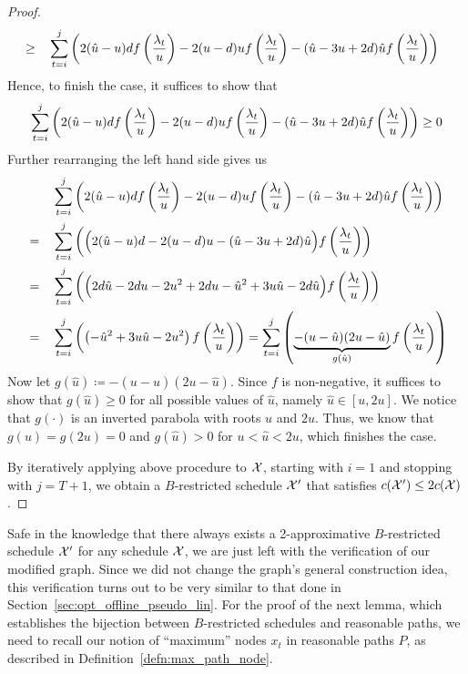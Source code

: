 \begin{proof}
\begin{align*}
	&\ge&&\sum\limits_{t=i}^j\left(2(\hat{u}-u)d\*f\left(\frac{\lambda_t}{u}\right)-2(u-d)uf\left(\frac{\lambda_t}{u}\right)-(\hat{u}-3u+2d)\hat{u}f\left(\frac{\lambda_t}{u}\right)\right)
\end{align*}
Hence, to finish the case, it suffices to show that
\begin{equation*}
	\sum\limits_{t=i}^j\left(2(\hat{u}-u)d\*f\left(\frac{\lambda_t}{u}\right)-2(u-d)uf\left(\frac{\lambda_t}{u}\right)-(\hat{u}-3u+2d)\hat{u}f\left(\frac{\lambda_t}{u}\right)\right)\ge 0
\end{equation*}
Further rearranging the left hand side gives us
\begin{align*}
	&&&\sum\limits_{t=i}^j\left(2(\hat{u}-u)d\*f\left(\frac{\lambda_t}{u}\right)-2(u-d)uf\left(\frac{\lambda_t}{u}\right)-(\hat{u}-3u+2d)\hat{u}f\left(\frac{\lambda_t}{u}\right)\right)\\
	&=&&\sum\limits_{t=i}^j\left(\Bigl(2(\hat{u}-u)d-2(u-d)u-(\hat{u}-3u+2d)\hat{u}\Bigr)f\left(\frac{\lambda_t}{u}\right)\right)\\
	&=&&\sum\limits_{t=i}^j\left(\Bigl(2d\hat{u}-2du-2u^2+2du-\hat{u}^2+3u\hat{u}-2d\hat{u}\Bigr)f\left(\frac{\lambda_t}{u}\right)\right)\\
	&=&&\sum\limits_{t=i}^j\left(\left(-\hat{u}^2+3u\hat{u}-2u^2\right)f\left(\frac{\lambda_t}{u}\right)\right)=\sum\limits_{t=i}^j\left(\underbrace{-(u-\hat{u})(2u-\hat{u})}_{g(\hat{u})}f\left(\frac{\lambda_t}{u}\right)\right) 
\end{align*}
Now let $g(\hat{u})\coloneqq-(u-\hat{u})(2u-\hat{u})$. Since $f$ is non-negative, it suffices to show that $g(\hat{u})\ge0$ for all possible values of $\hat{u}$, namely $\hat{u}\in[u,2u]$. We notice that $g(\cdot)$ is an inverted parabola with roots $u$ and $2u$. Thus, we know that $g(u)=g(2u)=0$ and $g(\hat{u})>0$ for $u<\hat{u}<2u$, which finishes the case.

By iteratively applying above procedure to $\mathcal{X}$, starting with $i=1$ and stopping with $j=T+1$, we obtain a $B$-restricted schedule $\mathcal{X}'$ that satisfies $c(\mathcal{X}')\le2c(\mathcal{X})$.
\end{proof}
Safe in the knowledge that there always exists a 2-approximative $B$-restricted schedule $\mathcal{X}'$ for any schedule $\mathcal{X}$, we are just left with the verification of our modified graph. Since we did not change the graph's general construction idea, this verification turns out to be very similar to that done in Section~\ref{sec:opt_offline_pseudo_lin}. For the proof of the next lemma, which establishes the bijection between $B$-restricted schedules and reasonable paths, we need to recall our notion of ``maximum'' nodes $x_t$ in reasonable paths $P$, as described in Definition~\ref{defn:max_path_node}.
